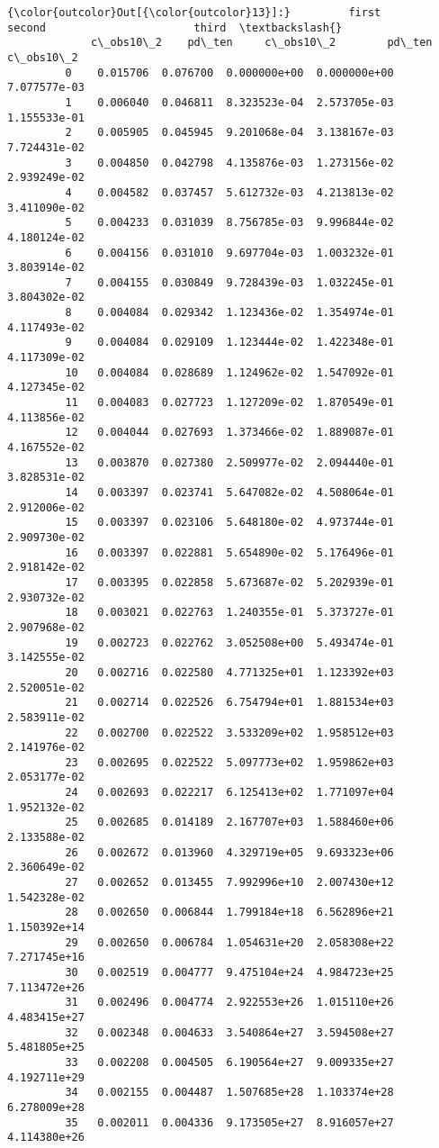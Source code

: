 \documentclass{article}
\begin{document}
            \begin{Verbatim}[commandchars=\\\{\}]
{\color{outcolor}Out[{\color{outcolor}13}]:}         first                  second                       third  \textbackslash{}
             c\_obs10\_2    pd\_ten     c\_obs10\_2        pd\_ten     c\_obs10\_2   
         0    0.015706  0.076700  0.000000e+00  0.000000e+00  7.077577e-03   
         1    0.006040  0.046811  8.323523e-04  2.573705e-03  1.155533e-01   
         2    0.005905  0.045945  9.201068e-04  3.138167e-03  7.724431e-02   
         3    0.004850  0.042798  4.135876e-03  1.273156e-02  2.939249e-02   
         4    0.004582  0.037457  5.612732e-03  4.213813e-02  3.411090e-02   
         5    0.004233  0.031039  8.756785e-03  9.996844e-02  4.180124e-02   
         6    0.004156  0.031010  9.697704e-03  1.003232e-01  3.803914e-02   
         7    0.004155  0.030849  9.728439e-03  1.032245e-01  3.804302e-02   
         8    0.004084  0.029342  1.123436e-02  1.354974e-01  4.117493e-02   
         9    0.004084  0.029109  1.123444e-02  1.422348e-01  4.117309e-02   
         10   0.004084  0.028689  1.124962e-02  1.547092e-01  4.127345e-02   
         11   0.004083  0.027723  1.127209e-02  1.870549e-01  4.113856e-02   
         12   0.004044  0.027693  1.373466e-02  1.889087e-01  4.167552e-02   
         13   0.003870  0.027380  2.509977e-02  2.094440e-01  3.828531e-02   
         14   0.003397  0.023741  5.647082e-02  4.508064e-01  2.912006e-02   
         15   0.003397  0.023106  5.648180e-02  4.973744e-01  2.909730e-02   
         16   0.003397  0.022881  5.654890e-02  5.176496e-01  2.918142e-02   
         17   0.003395  0.022858  5.673687e-02  5.202939e-01  2.930732e-02   
         18   0.003021  0.022763  1.240355e-01  5.373727e-01  2.907968e-02   
         19   0.002723  0.022762  3.052508e+00  5.493474e-01  3.142555e-02   
         20   0.002716  0.022580  4.771325e+01  1.123392e+03  2.520051e-02   
         21   0.002714  0.022526  6.754794e+01  1.881534e+03  2.583911e-02   
         22   0.002700  0.022522  3.533209e+02  1.958512e+03  2.141976e-02   
         23   0.002695  0.022522  5.097773e+02  1.959862e+03  2.053177e-02   
         24   0.002693  0.022217  6.125413e+02  1.771097e+04  1.952132e-02   
         25   0.002685  0.014189  2.167707e+03  1.588460e+06  2.133588e-02   
         26   0.002672  0.013960  4.329719e+05  9.693323e+06  2.360649e-02   
         27   0.002652  0.013455  7.992996e+10  2.007430e+12  1.542328e-02   
         28   0.002650  0.006844  1.799184e+18  6.562896e+21  1.150392e+14   
         29   0.002650  0.006784  1.054631e+20  2.058308e+22  7.271745e+16   
         30   0.002519  0.004777  9.475104e+24  4.984723e+25  7.113472e+26   
         31   0.002496  0.004774  2.922553e+26  1.015110e+26  4.483415e+27   
         32   0.002348  0.004633  3.540864e+27  3.594508e+27  5.481805e+25   
         33   0.002208  0.004505  6.190564e+27  9.009335e+27  4.192711e+29   
         34   0.002155  0.004487  1.507685e+28  1.103374e+28  6.278009e+28   
         35   0.002011  0.004336  9.173505e+27  8.916057e+27  4.114380e+26   
         

\end{Verbatim}
\end{document}
